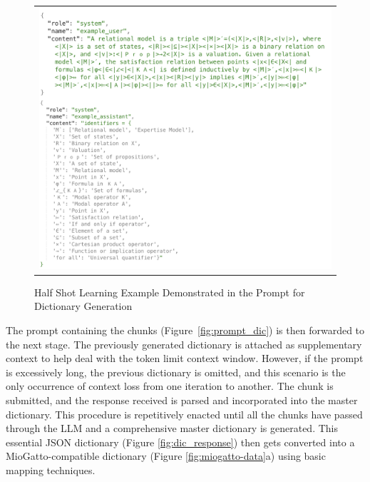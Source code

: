\begin{figure}[htpb]
  \centering
  \begin{tabular}{c}
  \includegraphics[width=14cm]{images/Prompt_dict_example.png}
  \end{tabular}
  \caption{Half Shot Learning Example Demonstrated in the Prompt for Dictionary Generation}\label{fig:prompt_dic_example}
\end{figure}

The prompt containing the chunks (Figure~\ref{fig:prompt_dic}) is then forwarded to the next stage. The previously generated dictionary is attached as supplementary context to help deal with the token limit context window.
However, if the prompt is excessively long, the previous dictionary is omitted, and this scenario is the only occurrence of context loss from one iteration to another. The chunk is submitted, and the response received is parsed and incorporated into the master dictionary. This procedure is repetitively enacted until all the chunks have passed through the LLM and a comprehensive master dictionary is generated. This essential JSON dictionary (Figure \ref{fig:dic_response}) then gets converted into a MioGatto-compatible dictionary (Figure \ref{fig:miogatto-data}a) using basic mapping techniques.

